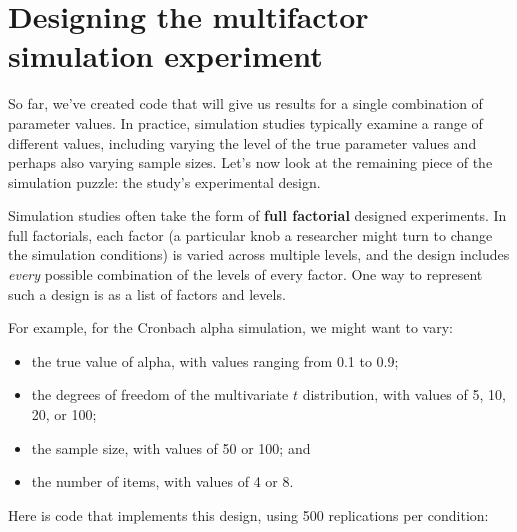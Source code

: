 \documentclass[
]{book}
\providecommand{\tightlist}{%
  \setlength{\itemsep}{0pt}\setlength{\parskip}{0pt}}
\begin{document}
\hypertarget{exp_design}{%
\chapter{Designing the multifactor simulation experiment}\label{exp_design}}

So far, we've created code that will give us results for a single combination of parameter values. In practice, simulation studies typically examine a range of different values, including varying the level of the true parameter values and perhaps also varying sample sizes. Let's now look at the remaining piece of the simulation puzzle: the study's experimental design.

Simulation studies often take the form of \textbf{full factorial} designed experiments. In full factorials, each factor (a particular knob a researcher might turn to change the simulation conditions) is varied across multiple levels, and the design includes \emph{every} possible combination of the levels of every factor. One way to represent such a design is as a list of factors and levels.

For example, for the Cronbach alpha simulation, we might want to vary:

\begin{itemize}
\tightlist
\item
  the true value of alpha, with values ranging from 0.1 to 0.9;
\item
  the degrees of freedom of the multivariate \(t\) distribution, with values of 5, 10, 20, or 100;
\item
  the sample size, with values of 50 or 100; and
\item
  the number of items, with values of 4 or 8.
\end{itemize}

Here is code that implements this design, using 500 replications per condition:
\end{document}

